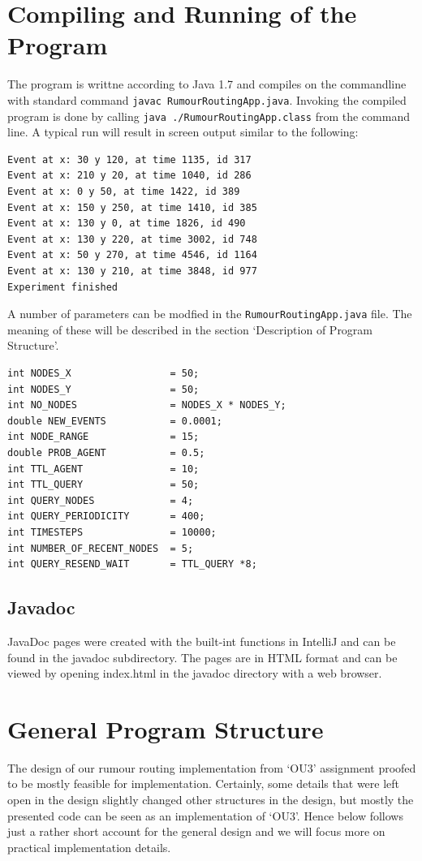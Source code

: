 \documentclass[a4paper,11pt,twoside]{article}
\begin{document}
\section{Compiling and Running of the Program}

The program is writtne according to Java 1.7 and compiles on the
commandline with standard command \texttt{javac RumourRoutingApp.java}.
Invoking the compiled program is done by calling \texttt{java
  ./RumourRoutingApp.class} from the command line.
A typical run will result in screen output similar to the following:
\begin{verbatim}
Event at x: 30 y 120, at time 1135, id 317
Event at x: 210 y 20, at time 1040, id 286
Event at x: 0 y 50, at time 1422, id 389
Event at x: 150 y 250, at time 1410, id 385
Event at x: 130 y 0, at time 1826, id 490
Event at x: 130 y 220, at time 3002, id 748
Event at x: 50 y 270, at time 4546, id 1164
Event at x: 130 y 210, at time 3848, id 977
Experiment finished
\end{verbatim}

A number of parameters can be modfied in the
\texttt{RumourRoutingApp.java} file. The meaning of these will be
described in the section `Description of Program Structure'.
\begin{verbatim}
int NODES_X                 = 50;
int NODES_Y                 = 50;
int NO_NODES                = NODES_X * NODES_Y;
double NEW_EVENTS           = 0.0001;
int NODE_RANGE              = 15;
double PROB_AGENT           = 0.5;
int TTL_AGENT               = 10;
int TTL_QUERY               = 50;
int QUERY_NODES             = 4;
int QUERY_PERIODICITY       = 400;
int TIMESTEPS               = 10000;
int NUMBER_OF_RECENT_NODES  = 5;
int QUERY_RESEND_WAIT       = TTL_QUERY *8;
\end{verbatim}



\subsection{Javadoc}
JavaDoc pages were created with the built-int functions in IntelliJ
and can be found in the javadoc subdirectory. The pages are in HTML
format and can be viewed by opening index.html in the javadoc
directory with a web browser.



\section{General Program Structure}
The design of our rumour routing implementation from `OU3' assignment
proofed to be mostly feasible for implementation. Certainly, some
details that were left open in the design slightly changed other
structures in the design, but mostly the presented code can be seen as
an implementation of `OU3'. Hence below follows just a rather short
account for the general design and we will focus more on practical
implementation details.
\end{document}
